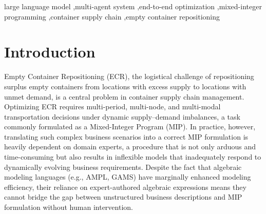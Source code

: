 \documentclass[preprint,12pt]{elsarticle}
\begin{document}
\begin{frontmatter}

\begin{keyword}



large language model \sep multi-agent system \sep end-to-end optimization \sep mixed-integer programming \sep container supply chain \sep empty container repositioning
\end{keyword}

\end{frontmatter}

\linenumbers


\section{Introduction}
Empty Container Repositioning (ECR), the logistical challenge of repositioning surplus empty containers from locations with excess supply to locations with unmet demand, is a central problem in container supply chain management. Optimizing ECR requires multi-period, multi-node, and multi-modal transportation decisions under dynamic supply--demand imbalances, a task commonly formulated as a Mixed-Integer Program (MIP). In practice, however, translating such complex business scenarios into a correct MIP formulation is heavily dependent on domain experts, a procedure that is not only arduous and time-consuming but also results in inflexible models that inadequately respond to dynamically evolving business requirements. Despite the fact that algebraic modeling languages (e.g., AMPL, GAMS) have marginally enhanced modeling efficiency, their reliance on expert-authored algebraic expressions means they cannot bridge the gap between unstructured business descriptions and MIP formulation without human intervention.
\end{document}
